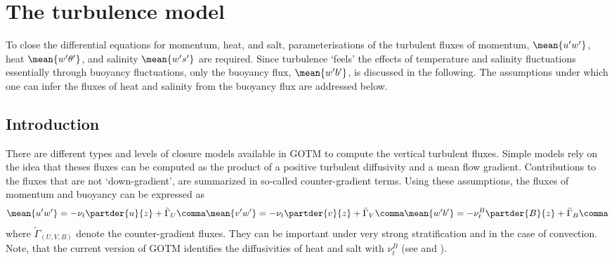 %
%

\section{The turbulence model \label{sec:turbulenceIntro}}

To close the differential equations for momentum, heat, and salt,
parameterisations of the turbulent fluxes of momentum, $\mean{u' w'}$, heat
$\mean{w'\theta'}$, and salinity $\mean{w's'}$ are required. Since
turbulence `feels' the effects of temperature and salinity
fluctuations essentially through buoyancy fluctuations, only the
buoyancy flux, $\mean{w'b'}$, is discussed in the following. The
assumptions under which one can infer the fluxes of heat and salinity
from the buoyancy flux are addressed below.

\subsection{Introduction}

There are different types and levels of closure models available in
GOTM to compute the vertical turbulent fluxes. Simple models rely on
the idea that theses fluxes can be computed as the product of a
positive turbulent diffusivity and a mean flow gradient. Contributions
to the fluxes that are not `down-gradient', are summarized in
so-called counter-gradient terms. Using these assumptions, the fluxes
of momentum and buoyancy can be expressed as
\begin{equation}
  \label{fluxes}
  \mean{u' w'}      = - \nu_t  \partder{u}{z}  + \tilde{\Gamma}_U \comma
  \mean{v' w'}      = - \nu_t  \partder{v}{z}  + \tilde{\Gamma}_V \comma
  \mean{w' b'}      = - \nu^B_t \partder{B}{z} + \tilde{\Gamma}_B
\comma
\end{equation}
where $\tilde{\Gamma}_{(U,V,B)}$ denote the counter-gradient fluxes.
They can be important under very strong stratification and in the case
of convection. Note, that the current version of GOTM identifies the
diffusivities of heat and salt with $\nu^B_t$ (see
 and ).  

